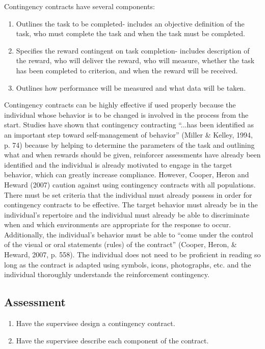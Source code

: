 Contingency contracts have several components: 
\begin{enumerate}
\item Outlines the task to be completed- includes an objective definition of the task, who must complete the task and when the task must be completed.
\item Specifies the reward contingent on task completion- includes description of the reward, who will deliver the reward, who will measure, whether the task has been completed to criterion, and when the reward will be received.
\item Outlines how performance will be measured and what data will be taken. 
\end{enumerate}

Contingency contracts can be highly effective if used properly because the individual whose behavior is to be changed is involved in the process from the start. Studies have shown that contingency contracting ``...has been identified as an important step toward self-management of behavior'' (Miller \& Kelley, 1994, p. 74) because by helping to determine the parameters of the task and outlining what and when rewards should be given, reinforcer assessments have already been identified and the individual is already motivated to engage in the target behavior, which can greatly increase compliance. However, Cooper, Heron and Heward (2007) caution against using contingency contracts with all populations. There must be set criteria that the individual must already possess in order for contingency contracts to be effective. The target behavior must already be in the individual's repertoire and the individual must already be able to discriminate when and which environments are appropriate for the response to occur. Additionally, the individual's behavior must be able to ``come under the control of the visual or oral statements (rules) of the contract'' (Cooper, Heron, \& Heward, 2007, p. 558).  The individual does not need to be proficient in reading so long as the contract is adapted using symbols, icons, photographs, etc. and the individual thoroughly understands the reinforcement contingency. 
%
\subsection{Assessment}
\begin{enumerate}
\item Have the supervisee design a contingency contract.
\item Have the supervisee describe each component of the contract.
\end{enumerate}
%
